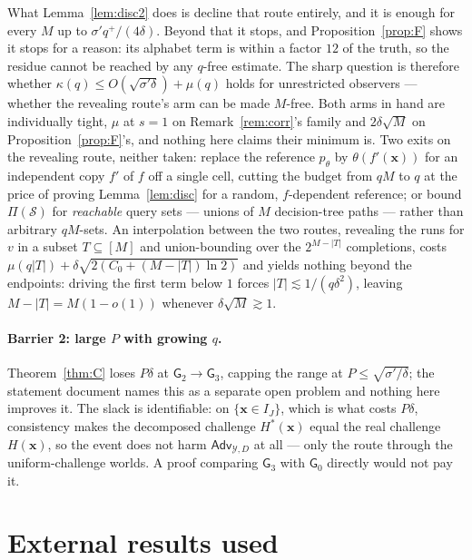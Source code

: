 \documentclass{aicr-solution}
\newcommand{\Adv}{\mathsf{Adv}}
\newcommand{\vx}{\mathbf{x}}
\begin{document}
What Lemma~\ref{lem:disc2} does is decline that route entirely, and it is enough
for every $M$ up to $\sigma'q^{+}/(4\delta)$. Beyond that it stops, and
Proposition~\ref{prop:F} shows it stops for a reason: its alphabet term is within a
factor $12$ of the truth, so the residue cannot be reached by any $q$-free
estimate. The sharp question is therefore whether
$\kappa(q)\le O(\sqrt{\sigma'\delta})+\mu(q)$ holds for unrestricted observers ---
whether the revealing route's arm can be made $M$-free. Both arms in hand are
individually tight, $\mu$ at $s=1$ on Remark~\ref{rem:corr}'s family and
$2\delta\sqrt M$ on Proposition~\ref{prop:F}'s, and nothing here claims their
minimum is. Two exits on the revealing route, neither taken: replace the reference
$p_\theta$ by $\theta(f'(\vx))$ for an independent copy $f'$ of $f$ off a single
cell, cutting the budget from $qM$ to $q$ at the price of proving
Lemma~\ref{lem:disc} for a random, $f$-dependent reference; or bound
$\Pi(\mathcal S)$ for \emph{reachable} query sets --- unions of $M$ decision-tree
paths --- rather than arbitrary $qM$-sets. An interpolation between the two routes,
revealing the runs for $v$ in a subset $T\subseteq[M]$ and union-bounding over the
$2^{M-|T|}$ completions, costs $\mu(q|T|)+\delta\sqrt{2(C_0+(M-|T|)\ln2)}$ and
yields nothing beyond the endpoints: driving the first term below $1$ forces
$|T|\lesssim1/(q\delta^{2})$, leaving $M-|T|=M(1-o(1))$ whenever
$\delta\sqrt M\gtrsim1$.

\paragraph{Barrier 2: large $P$ with growing $q$.} Theorem~\ref{thm:C} loses
$P\delta$ at $\mathsf G_2\to\mathsf G_3$, capping the range at
$P\le\sqrt{\sigma'/\delta}$; the statement document names this as a separate open
problem and nothing here improves it. The slack is identifiable: on
$\{\vx\in I_J\}$, which is what costs $P\delta$, consistency makes the decomposed
challenge $H^{*}(\vx)$ equal the real challenge $H(\vx)$, so the event does not
harm $\Adv_{\mathcal Y,D}$ at all --- only the route through the uniform-challenge
worlds. A proof comparing $\mathsf G_3$ with $\mathsf G_0$ directly would not pay
it.

\section{External results used}
\end{document}
